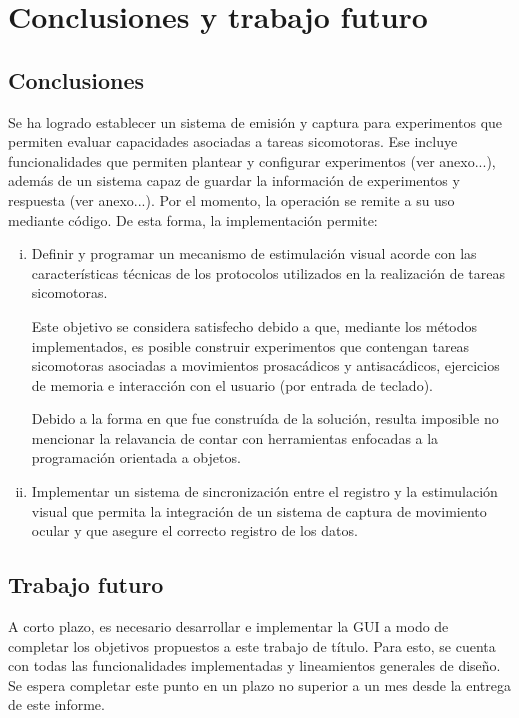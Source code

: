 \documentclass[\main/main.tex]{subfiles}
\begin{document}
\chapter{Conclusiones y trabajo futuro}
\label{cha:05_conclusiones_y_trabajo_futuro}
	\section{Conclusiones}
	\label{sec:05_conclusiones}
		Se ha logrado establecer un sistema de emisión y captura para experimentos que permiten evaluar capacidades asociadas a tareas sicomotoras. Ese incluye funcionalidades que permiten plantear y configurar experimentos (ver anexo...), además de un sistema capaz de guardar la información de experimentos y respuesta (ver anexo...). Por el momento, la operación se remite a su uso mediante código. De esta forma, la implementación permite:

		\begin{enumerate}[(i)]\setlength\itemsep{-0.2em}
			\item Definir y programar un mecanismo de estimulación visual acorde con las características técnicas de los protocolos utilizados en la realización de tareas sicomotoras.

			Este objetivo se considera satisfecho debido a que, mediante los métodos implementados, es posible construir experimentos que contengan tareas sicomotoras asociadas a movimientos prosacádicos y antisacádicos, ejercicios de memoria e interacción con el usuario (por entrada de teclado). 

			Debido a la forma en que fue construída de la solución, resulta imposible no mencionar la relavancia de contar con herramientas enfocadas a la programación orientada a objetos. 

			\item Implementar un sistema de sincronización entre el registro y la estimulación visual que permita la integración de un sistema de captura de movimiento ocular y que asegure el correcto registro de los datos.

		\end{enumerate}

	\section{Trabajo futuro}
	\label{sec:05_trabajo_futuro}
		A corto plazo, es necesario desarrollar e implementar la GUI a modo de completar los objetivos propuestos a este trabajo de título. Para esto, se cuenta con todas las funcionalidades implementadas y lineamientos generales de diseño. Se espera completar este punto en un plazo no superior a un mes desde la entrega de este informe.  
\end{document}
